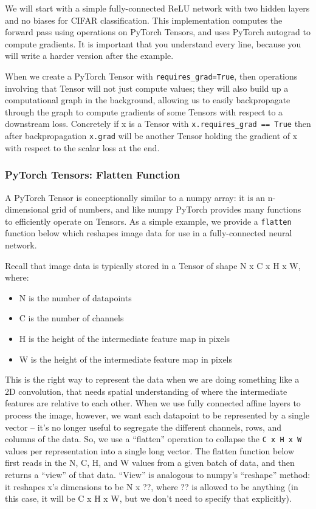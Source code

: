 \documentclass[11pt]{article}
\providecommand{\tightlist}{%
      \setlength{\itemsep}{0pt}\setlength{\parskip}{0pt}}
\begin{document}
We will start with a simple fully-connected ReLU network with two hidden
layers and no biases for CIFAR classification. This implementation
computes the forward pass using operations on PyTorch Tensors, and uses
PyTorch autograd to compute gradients. It is important that you
understand every line, because you will write a harder version after the
example.

When we create a PyTorch Tensor with \texttt{requires\_grad=True}, then
operations involving that Tensor will not just compute values; they will
also build up a computational graph in the background, allowing us to
easily backpropagate through the graph to compute gradients of some
Tensors with respect to a downstream loss. Concretely if x is a Tensor
with \texttt{x.requires\_grad\ ==\ True} then after backpropagation
\texttt{x.grad} will be another Tensor holding the gradient of x with
respect to the scalar loss at the end.

    \hypertarget{pytorch-tensors-flatten-function}{%
\subsubsection{PyTorch Tensors: Flatten
Function}\label{pytorch-tensors-flatten-function}}

A PyTorch Tensor is conceptionally similar to a numpy array: it is an
n-dimensional grid of numbers, and like numpy PyTorch provides many
functions to efficiently operate on Tensors. As a simple example, we
provide a \texttt{flatten} function below which reshapes image data for
use in a fully-connected neural network.

Recall that image data is typically stored in a Tensor of shape N x C x
H x W, where:

\begin{itemize}
\tightlist
\item
  N is the number of datapoints
\item
  C is the number of channels
\item
  H is the height of the intermediate feature map in pixels
\item
  W is the height of the intermediate feature map in pixels
\end{itemize}

This is the right way to represent the data when we are doing something
like a 2D convolution, that needs spatial understanding of where the
intermediate features are relative to each other. When we use fully
connected affine layers to process the image, however, we want each
datapoint to be represented by a single vector -- it's no longer useful
to segregate the different channels, rows, and columns of the data. So,
we use a ``flatten'' operation to collapse the \texttt{C\ x\ H\ x\ W}
values per representation into a single long vector. The flatten
function below first reads in the N, C, H, and W values from a given
batch of data, and then returns a ``view'' of that data. ``View'' is
analogous to numpy's ``reshape'' method: it reshapes x's dimensions to
be N x ??, where ?? is allowed to be anything (in this case, it will be
C x H x W, but we don't need to specify that explicitly).
\end{document}
